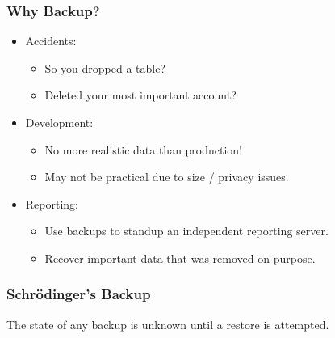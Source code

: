 \begin{frame}
    \frametitle{Why Backup?}

    \begin{itemize}
        \item Accidents:

        \begin{itemize}
            \item So you dropped a table?\pause
            \item Deleted your most important account?\pause
        \end{itemize}

        \item Development:

        \begin{itemize}
            \item No more realistic data than production!\pause
            \item May not be practical due to size / privacy issues.\pause
        \end{itemize}

        \item Reporting:

        \begin{itemize}
            \item Use backups to standup an independent reporting server.\pause
            \item Recover important data that was removed on purpose.
        \end{itemize}
    \end{itemize}
\end{frame}

\begin{frame}
    \frametitle{Schr\"{o}dinger’s Backup}

    The state of any backup is unknown until a restore is attempted.
\end{frame}

